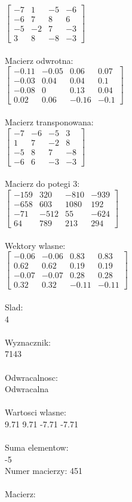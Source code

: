 \documentclass[a4paper,12pt]{article}
\begin{document}
$\begin{bmatrix} -7&1&-5&-6\\-6&7&8&6\\-5&-2&7&-3\\3&8&-8&-3 \end{bmatrix}$
\\
\\
Macierz odwrotna:\\

$\begin{bmatrix} -0.11&-0.05&0.06&0.07\\-0.03&0.04&0.04&0.1\\-0.08&0&0.13&0.04\\0.02&0.06&-0.16&-0.1 \end{bmatrix}$
\\
\\
Macierz transponowana:\\

$\begin{bmatrix} -7&-6&-5&3\\1&7&-2&8\\-5&8&7&-8\\-6&6&-3&-3 \end{bmatrix}$
\\
\\
Macierz do potegi 3:\\

$\begin{bmatrix} -159&320&-810&-939\\-658&603&1080&192\\-71&-512&55&-624\\64&789&213&294 \end{bmatrix}$
\\
\\
Wektory wlasne:\\

$\begin{bmatrix} -0.06&-0.06&0.83&0.83\\0.62&0.62&0.19&0.19\\-0.07&-0.07&0.28&0.28\\0.32&0.32&-0.11&-0.11 \end{bmatrix}$
\\
\\
Slad:\\
4
\\
\\
Wyznacznik:\\
7143
\\
\\
Odwracalnosc:\\
Odwracalna
\\
\\
Wartosci wlasne:\\
9.71 9.71 -7.71 -7.71
\\
\\
Suma elementow:\\
-5
\\
\newpage
Numer macierzy:
451
\\
\\
Macierz:\\
\end{document}
